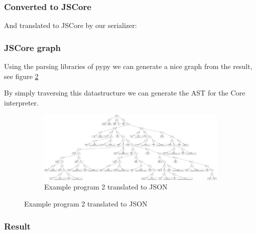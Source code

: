 
\subsubsection{Converted to JSCore}

And translated to JSCore by our serializer:

\begin{footnotesize}

\end{footnotesize}

\subsubsection{JSCore graph}

Using the parsing libraries of pypy we can generate a nice graph from the result, 
see figure \ref{fig:fibgraph}

By simply traversing this datastructure we can generate the AST for the Core interpreter.

\begin{figure}
\begin{figure}[H]
\includegraphics[width=\textwidth]{../interpreter/tests/fib.png}
\caption{Example program 2 translated to JSON}
\label{fig:fibgraph}
\end{figure}
\end{figure}

\subsubsection{Result}
